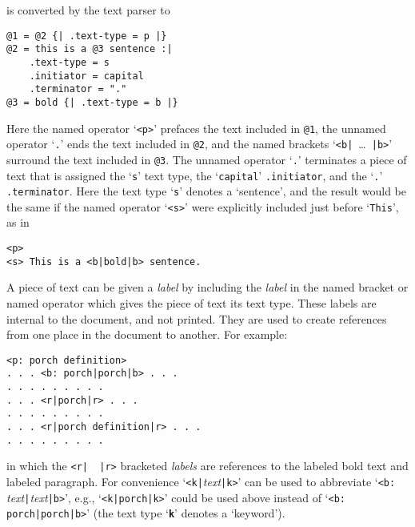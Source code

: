 \documentclass[12pt]{article}
\makeatletter
\newcommand{\ttmkey}[2]{{\tt \bf #1}\index{#1@{\tt #1}!#2}}
\newenvironment{indpar}[1][0.3in]%
	{\begin{list}{}%
		     {\setlength{\itemsep}{0in}%
		      \setlength{\topsep}{0in}%
		      \setlength{\parsep}{1ex}%
		      \setlength{\labelwidth}{#1}%
		      \setlength{\leftmargin}{#1}%
		      \addtolength{\leftmargin}{\labelsep}}%
	 \item}%
	{\end{list}}
\makeatother
\begin{document}
is converted by the text parser to

\begin{indpar}\begin{verbatim}
@1 = @2 {| .text-type = p |}
@2 = this is a @3 sentence :|
    .text-type = s
    .initiator = capital 
    .terminator = "."
@3 = bold {| .text-type = b |}
\end{verbatim}\end{indpar}

Here the named operator `\verb|<p>|' prefaces the text included in \verb|@1|,
the unnamed operator `\verb|.|' ends the text included in \verb|@2|,
and the named brackets `\verb/<b|/~\ldots~\verb/|b>/' surround the text
included in \verb|@3|.  The unnamed operator `\verb|.|' terminates
a piece of text that is assigned the `\verb|s|' text type,
the `\verb|capital|' \verb|.initiator|, and
the `\verb|.|' \verb|.terminator|.  Here the text type `\verb|s|' denotes
a `sentence', and the result would be the same if
the named operator `\verb|<s>|' were explicitly included just before
`\verb|This|', as in

\begin{indpar}\begin{verbatim}
<p>
<s> This is a <b|bold|b> sentence.
\end{verbatim}\end{indpar}

A piece of text can be given a {\em label} by including the {\em label}
in the named bracket or named operator which gives the piece of text
its text type.
These labels are internal to the document, and not printed.
They are used to create references from one place in the document to
another.  For example:

\begin{indpar}\begin{verbatim}
<p: porch definition>
. . . <b: porch|porch|b> . . .
. . . . . . . . .
. . . <r|porch|r> . . .
. . . . . . . . .
. . . <r|porch definition|r> . . .
. . . . . . . . .
\end{verbatim}\end{indpar}

in which the \verb/<r|  |r>/ bracketed {\em labels} are references
to the labeled bold text and labeled paragraph.  For convenience
`\verb/<k|/{\em text}\verb/|k>/' can be used to abbreviate
`\verb/<b:/ {\em text}\verb/|/{\em text}\verb/|b>/', e.g.,
`\verb/<k|porch|k>/' could be used above instead of
`\verb/<b: porch|porch|b>/' (the text type `\ttmkey{k}{text type}'
denotes a `keyword').
\end{document}
